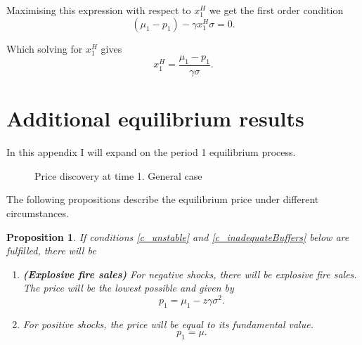 \documentclass[11pt]{article}
\newtheorem{proposition}{Proposition}
\begin{document}
\begin{appendices}
Maximising this expression with respect to $x^H_1$ we get the first order condition
\begin{equation}
(\mu_1 - p_1) - \gamma x^H_1 \sigma = 0.
\end{equation}

Which solving for $x^H_1$ gives
\begin{equation}
x^H_1  = \frac{\mu_1 - p_1}{\gamma \sigma}.
\end{equation}


\section{Additional equilibrium results}
\label{proof:p1eqm}
In this appendix I will expand on the period 1 equilibrium process.


\begin{figure}[h]
\centering
{}
\caption{Price discovery at time 1. General case}
\label{fig:t1pricediscovery}
\end{figure}

The following propositions describe the equilibrium price under different circumstances.


\begin{proposition} \label{p_explosiveFiresales}
If conditions \ref{c_unstable} and \ref{c_inadequateBuffers} below are fulfilled, there will be

\begin{enumerate}[label = \roman*)]
\item[\textnormal{i)}] \textnormal{\textbf{(Explosive fire sales)}} For negative shocks, there will be explosive fire sales. The price will be the lowest possible and given by
\begin{equation}
p_1 = \mu_1 - z\gamma\sigma^2.
\end{equation}
\item[\textnormal{ii)}]  For positive shocks, the price will be equal to its fundamental value.
\begin{equation}
p_1 =  \mu.
\end{equation}
\end{enumerate}


\end{proposition}
\end{appendices}
\end{document}
